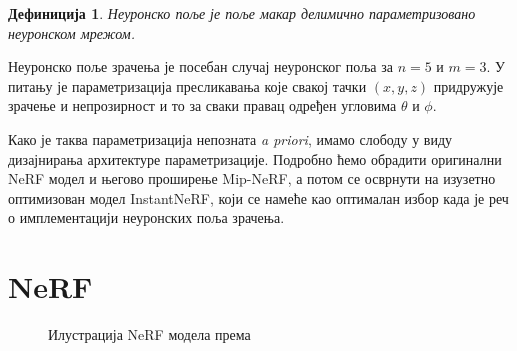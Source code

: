 \documentclass[12pt, a4paper, twoside]{book}
\numberwithin{equation}{chapter}
\numberwithin{theorem}{section}
\numberwithin{definition}{section}
\newtheorem{definitionChapter}{Дефиниција}
\numberwithin{definitionChapter}{chapter}
\begin{document}
	\begin{definitionChapter}
		Неуронско поље је поље макар делимично параметризовано неуронском мрежом.
	\end{definitionChapter}

	Неуронско поље зрачења је посебан случај неуронског поља за $n=5$ и $m=3$. У питању је параметризација
	пресликавања које свакој тачки $(x, y, z)$ придружује зрачење и непрозирност и то за сваки правац
	одређен угловима $\theta$ и $\phi$.

	Како је таква параметризација непозната \textit{a priori}, имамо слободу у виду дизајнирања архитектуре
	параметризације. Подробно ћемо обрадити оригинални NeRF модел и његово проширење Mip-NeRF, а
	потом се осврнути на изузетно оптимизован модел InstantNeRF, који се намеће као оптималан избор када је
	реч о имплементацији неуронских поља зрачења.

\section{NeRF}

\begin{figure}[H]
	\begin{center}
	\end{center}
	\caption{Илустрација NeRF модела према \cite{nerf}}
	\label{fig-nerf-pipeline}
\end{figure}
\end{document}
